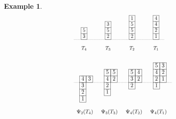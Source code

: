 \documentclass[leqno,11pt]{amsart}
\newtheorem{ex}[thm]{\bf Example}
\numberwithin{equation}{section}
\newcommand{\ov}{\overline}
\begin{document}
\begin{ex}
{%
$$\!\!\!\!
\resizebox{.43\hsize}{!}
{\def\lr#1{\multicolumn{1}{|@{\hspace{.75ex}}c@{\hspace{.75ex}}|}{\raisebox{-.04ex}{$#1$}}}\raisebox{-.6ex}
{$\begin{array}{ccccccccccccccccc}
\cline{10-10}\cline{14-14}
& & & & & & & & & \lr{1} & & & &\lr{4}\\
\cline{6-6}\cline{10-10}\cline{14-14}& & & & & \lr{3} & & & & \lr{5} & & & &\lr{\ov 4}\\
\cline{2-2}\cline{6-6}\cline{10-10}\cline{14-14}
& \lr{5} & & & & \lr{\ov 5} & & & & \lr{\ov 5} & & & & \lr{\ov 2}\\
\cline{2-2}\cline{6-6}\cline{10-10}\cline{14-14}
\ \, &\lr{\ov 3} & &  \, \ & & \lr{\ov 2} & &   \, \ & & \lr{\ov 2} & &  \, \ & & \lr{\ov 1}& \\
\cline{2-2}\cline{6-6}\cline{10-10}\cline{14-14}\cdashline{1-15}[0.5pt/1pt]\\ 
& \!\!\!\!\!\!\!\!\!T_4 \!\!\!\!\!\!\!\!\! & & &
& \!\!\!\!\!\!\!\!\!T_3 \!\!\!\!\!\!\!\!\! & & &
& \!\!\!\!\!\!\!\!\!T_2 \!\!\!\!\!\!\!\!\! & & & 
& \!\!\!\!\!\!\!\!\!T_1 \!\!\!\!\!\!\!\!\! & & & 
\end{array}$}}
$$
$$\resizebox{.42\hsize}{!}
{\def\lr#1{\multicolumn{1}{|@{\hspace{.75ex}}c@{\hspace{.75ex}}|}{\raisebox{-.04ex}{$#1$}}}\raisebox{-.6ex}
{$\begin{array}{ccccccccccccccccc}
\\
\cline{14-14}\cline{15-15}
& & & & & & & & & & & & & \lr{\ov{5}} & \lr{\ov{3}} \\
\cline{6-6}\cline{7-7}\cline{10-11}\cline{14-15}
& & & & & \lr{\ov{5}} &  \lr{\ov{5}} & &  & \lr{\ov{5}}&\lr{\ov{4}} & & & \lr{\ov{4}} &  \lr{\ov{2}}\\
\cline{2-3}\cline{6-7}\cline{10-11}\cline{14-15}
& \lr{\ov{4}} & \lr{\ov{3}}& & & \lr{\ov{4}} & \lr{\ov{2}} & & & \lr{\ov{3}} & \lr{\ov{2}}& & & \lr{\ov{2}} &  \lr{\ov{1}}& \\
\cline{2-3}\cdashline{1-5}[0.5pt/1pt]\cline{6-7}\cdashline{8-11}[0.5pt/1pt]
\cline{10-11}\cdashline{12-16}[0.5pt/1pt]\cline{14-15}
& \lr{\ov{3}} & & & & \lr{\ov{2}} & & &  & \lr{\ov{2}} & & & & \lr{\ov{1}} & \\
\cline{2-2}\cline{6-6}\cline{10-10}\cline{14-14}
& \lr{\ov{2}} & & & & \lr{\ov{1}} & \\
\cline{2-2}\cline{6-6}
& \lr{\ov{1}} \\
\cline{2-2}\\
\Psi_2(T_4)\!\!\!\!\!\!\!\!\!\!\!\!\!\!\!\!\!\! & & & & 
\Psi_3(T_3)\!\!\!\!\!\!\!\!\!\!\!\!\!\!\!\!\!\! & & & & 
\Psi_4(T_2)\!\!\!\!\!\!\!\!\!\!\!\!\!\!\!\!\!\! & & & & 
\Psi_4(T_1)\!\!\!\!\!\!\!\!\!\!\!\!\!\!\!\!\!\! 
\end{array}$}} \quad
$$
}
\end{ex}
\end{document}
